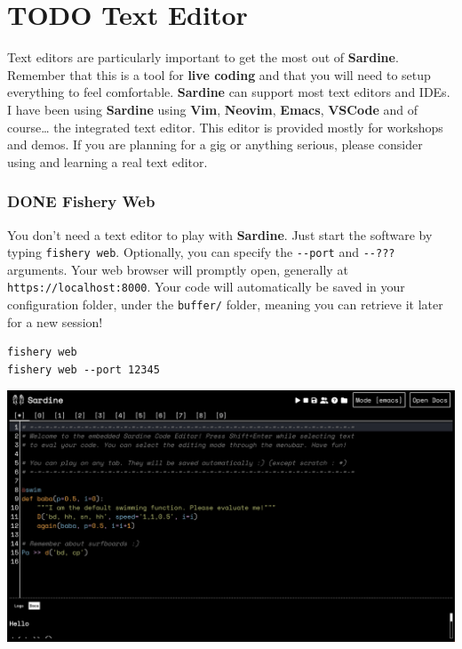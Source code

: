 \documentclass[11pt]{article}
\begin{document}
\section{{\bfseries\sffamily TODO} Text Editor}
\label{sec:orgfbd0163}

Text editors are particularly important to get the most out of \textbf{Sardine}. Remember that this is a tool for \textbf{live coding} and that you will need to setup everything to feel comfortable. \textbf{Sardine} can support most text editors and IDEs. I have been using \textbf{Sardine} using \textbf{Vim}, \textbf{Neovim}, \textbf{Emacs}, \textbf{VSCode} and of course\ldots{} the integrated text editor. This editor is provided mostly for workshops and demos. If you are planning for a gig or anything serious, please consider using and learning a real text editor.

\subsubsection{{\bfseries\sffamily DONE} Fishery Web}
\label{sec:orgba0bbd4}

You don't need a text editor to play with \textbf{Sardine}. Just start the software by typing \texttt{fishery web}. Optionally, you can specify the \texttt{-{}-port} and  \texttt{-{}-???} arguments. Your web browser will promptly open, generally at \texttt{https://localhost:8000}. Your code will automatically be saved in your configuration folder, under the \texttt{buffer/} folder, meaning you can retrieve it later for a new session!

\begin{verbatim}
fishery web
fishery web --port 12345
\end{verbatim}

\begin{center}
\includegraphics[width=.9\linewidth]{fishery_web.png}
\end{center}
\end{document}
